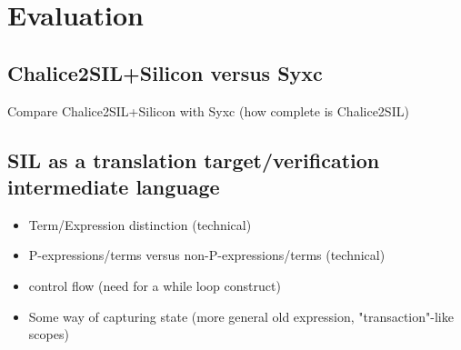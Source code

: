 
\section{Evaluation}

\subsection{Chalice2SIL+Silicon versus Syxc}
\begin{sketch}
Compare Chalice2SIL+Silicon with Syxc (how complete is Chalice2SIL)
\end{sketch}

\subsection{SIL as a translation target/verification intermediate language}
\begin{sketch}
\begin{itemize}
\item Term/Expression distinction (technical)
\item P-expressions/terms versus non-P-expressions/terms (technical)
\item control flow (need for a while loop construct)
\item Some way of capturing state (more general old expression, "transaction"-like scopes)
\end{itemize}
\end{sketch}
